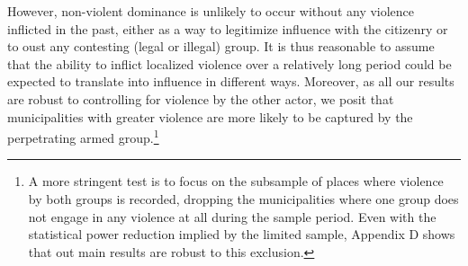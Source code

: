 \begin{table}[h]
\centering 
\caption{Descriptive statistics of main variables}
\label{chapter3_tab:descriptive}
\end{table}

However, non-violent dominance is unlikely to occur without any violence inflicted in the past, either as a way to legitimize influence with the citizenry or to oust any contesting (legal or illegal) group. It is thus reasonable to assume that the ability to inflict localized violence over a relatively long period could be expected to translate into influence in different ways. Moreover, as all our results are robust to controlling for violence by the other actor, we posit that municipalities with greater violence are more likely to be captured by the perpetrating armed group.\footnote{A more stringent test is to focus on the subsample of places where violence by both groups is recorded, dropping the municipalities where one group does not engage in any violence at all during the sample period. Even with the statistical power reduction implied by the limited sample, Appendix D shows that out main results are robust to this exclusion.}

